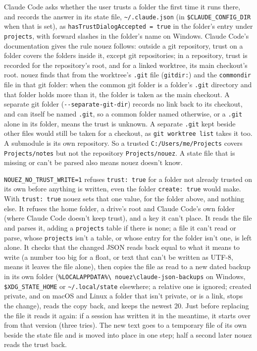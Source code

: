 \documentclass[10pt,a4paper]{article}
\newcommand{\code}[1]{\texttt{#1}}
\begin{document}
Claude Code asks whether the user trusts a folder the first time it runs there, and records the
answer in its state file, \code{\textasciitilde/.claude.json} (in \code{\$CLAUDE\_CONFIG\_DIR} when
that is set), as \code{hasTrustDialogAccepted = true} in the folder's entry under \code{projects},
with forward slashes in the folder's name on Windows. Claude Code's
documentation gives the rule nouez follows: outside a git repository, trust on a folder covers the
folders inside it, except git repositories; in a repository, trust is recorded for the
repository's root, and for a linked worktree, its main checkout's root. nouez finds that from the
worktree's \code{.git} file (\code{gitdir:}) and the \code{commondir} file in that git folder: when
the common git folder is a folder's \code{.git} directory and that folder holds more than it, the
folder is taken as the main checkout. A separate git folder (\code{-{}-separate-git-dir}) records no
link back to its checkout, and can itself be named \code{.git}, so a common folder named otherwise,
or a \code{.git} alone in its folder, means the trust is unknown. A separate \code{.git} kept beside
other files would still be taken for a checkout, as \code{git worktree list} takes it too. A
submodule is its own repository. So a trusted \code{C:/Users/me/Projects} covers \code{Projects/notes} but not the repository \code{Projects/nouez}. A state file that is
missing or can't be parsed also means nouez doesn't know.

\code{NOUEZ\_NO\_TRUST\_WRITE=1} refuses \code{trust: true} for a folder not already trusted on its
own before anything is written, even the folder \code{create: true} would make.
With \code{trust: true} nouez sets that one value, for the folder above, and nothing else. It
refuses the home folder, a drive's root and Claude Code's own folder (where Claude Code doesn't keep
trust), and a key it can't place. It reads the file and parses it, adding a \code{projects} table if there is none; a file it
can't read or parse, whose \code{projects} isn't a table, or whose entry for the folder isn't one, is
left alone. It checks that the changed JSON reads back equal to what it means to write (a number
too big for a float, or text that can't be written as UTF-8, means it leaves the file alone), then copies the file as
read to a new dated backup in its own folder (\code{\%LOCALAPPDATA\%\textbackslash
nouez\textbackslash claude-json-backups} on Windows, \code{\$XDG\_STATE\_HOME} or
\code{\textasciitilde/.local/state} elsewhere; a relative one is ignored; created private, and
on macOS and Linux a folder that isn't private, or is a link, stops the change), reads the copy back, and keeps
the newest 20. Just before replacing the file it reads it again: if a session has written it in
the meantime, it starts over from that version (three tries). The new text goes to a temporary
file of its own beside the state file and is moved into place in one step; half a second later
nouez reads the trust back.
\end{document}
